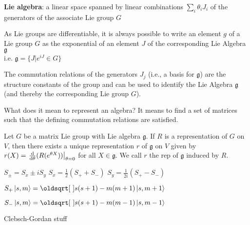 \begin{squishlist}
\item \textbf{Lie algebra}: a linear space spanned by linear combinations $\sum_i \theta_i J_i$ of the generators of the associate Lie group $G$
\item As Lie groups are differentiable, it is always possible to write an element $g$ of a Lie group $G$ as the exponential of an element $J$ of the corresponding Lie Algebra $\mathfrak{g}$ \\ i.e. $\mathfrak{g} = \{J | e^{iJ} \in G \}$
\item The commutation relations of the generators $J_j$ (i.e., a basis for $\mathfrak{g}$) are the structure constants of the group and can be used to identify the Lie Algebra $\mathfrak{g}$ (and thereby the corresponding Lie group $G$).
\item What does it mean to represent an algebra? It means to find a set of matrices such that the defining commutation relations are satisfied.
\item Let $G$ be a matrix Lie group with Lie algebra $\mathfrak{g}$. If $R$ is a representation of $G$ on $V$, then there exists a unique representation $r$ of $\mathfrak{g}$ on $V$ given by \\
$r(X) = \left.\frac{\textrm{d} }{\textrm{d} \theta}(R(e^{\theta X}))\right|_{\theta=0}$ for all $X \in \mathfrak{g}$. We call $r$ the rep of $\mathfrak{g}$ induced by $R$.
\end{squishlist}

\begin{squishlist}
    \item $S_{\pm} = S_x \pm i S_y$ \squishsep $S_x = \frac{1}{2} (S_+ + S_-)$ \squishsep $S_y = \frac{1}{2i} (S_+ - S_-)$
    \item $S_+ \ket{s,m} = \sqrt{s(s+1) - m(m+1)} \ket{s, m + 1}$
    \item $S_- \ket{s,m} = \sqrt{s(s+1) - m(m-1)} \ket{s, m-1}$
    \item Clebsch-Gordan stuff
\end{squishlist}


